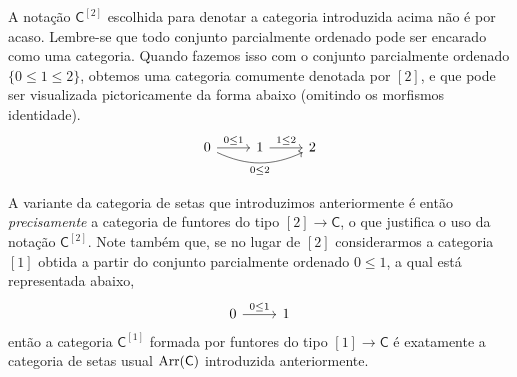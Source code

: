 \begin{obs}
  A notação $\mathsf{C}^{[2]}$ escolhida para denotar a categoria introduzida acima não é por acaso.
  Lembre-se que todo conjunto parcialmente ordenado pode ser encarado como uma categoria.
  Quando fazemos isso com o conjunto parcialmente ordenado $\{0 \leq 1 \leq 2\}$, obtemos uma categoria comumente denotada por $[2]$, e que pode ser visualizada pictoricamente da forma abaixo (omitindo os morfismos identidade).
  \begin{displaymath}
    \begin{tikzcd}
      0
      \arrow[r, "0 \leq 1"]
      \arrow[rr, bend right=25, "0 \leq 2" swap]
      & 1
      \arrow[r, "1 \leq 2"]
      & 2      
    \end{tikzcd}
  \end{displaymath}

  A variante da categoria de setas que introduzimos anteriormente é então \emph{precisamente} a categoria de funtores do tipo $[2] \to \mathsf{C}$, o que justifica o uso da notação $\mathsf{C}^{[2]}$.
  Note também que, se no lugar de $[2]$ considerarmos a categoria $[1]$ obtida a partir do conjunto parcialmente ordenado $0 \leq 1$, a qual está representada abaixo,
  \begin{displaymath}
    \begin{tikzcd}
      0
      \arrow[r, "0 \leq 1"]
      & 1
    \end{tikzcd}
  \end{displaymath}
  então a categoria $\mathsf{C}^{[1]}$ formada por funtores do tipo $[1] \to \mathsf{C}$ é exatamente a categoria de setas usual $\mathrm{Arr}(\mathsf{C})$ introduzida anteriormente.
\end{obs}

